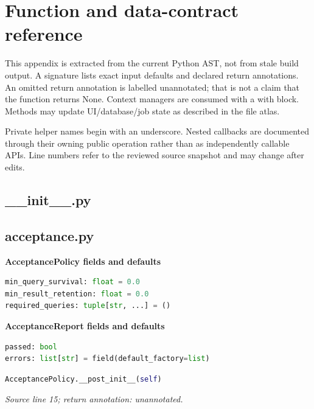 \chapter{Function and data-contract reference}

This appendix is extracted from the current Python AST, not from stale build output. A signature lists exact input defaults and declared return annotations. An omitted return annotation is labelled unannotated; that is not a claim that the function returns None. Context managers are consumed with a with block. Methods may update UI/database/job state as described in the file atlas.

Private helper names begin with an underscore. Nested callbacks are documented through their owning public operation rather than as independently callable APIs. Line numbers refer to the reviewed source snapshot and may change after edits.

\section{\_\_init\_\_.py}


\section{acceptance.py}


\textbf{AcceptancePolicy fields and defaults}


\begin{lstlisting}[language=Python]
min_query_survival: float = 0.0
min_result_retention: float = 0.0
required_queries: tuple[str, ...] = ()
\end{lstlisting}


\textbf{AcceptanceReport fields and defaults}


\begin{lstlisting}[language=Python]
passed: bool
errors: list[str] = field(default_factory=list)
\end{lstlisting}




\begin{lstlisting}[language=Python]
AcceptancePolicy.__post_init__(self)
\end{lstlisting}


{\small \textit{Source line 15; return annotation: unannotated.}}

